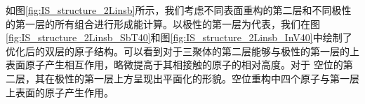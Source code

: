 如图\ref{fig:IS_structure_2Linsb}所示，我们考虑不同表面重构的第二层和不同极性的第一层的所有组合进行形成能计算。以极性的第一层为代表，我们在图\ref{fig:IS_structure_2Linsb_SbT40}和图\ref{fig:IS_structure_2Linsb_InV40}中绘制了优化后的双层的原子结构。可以看到对于三聚体的第二层能够与极性的第一层的上表面原子产生相互作用，略微提高于其相接触的原子的相对高度。对于 空位的第二层，其在极性的第一层上方呈现出平面化的形貌。空位重构中四个原子与第一层上表面的原子产生作用。

\begin{figure}[!htb]
    \begin{minipage}[b]{0.5\textwidth}
        \newline
\end{minipage}
\end{figure}
